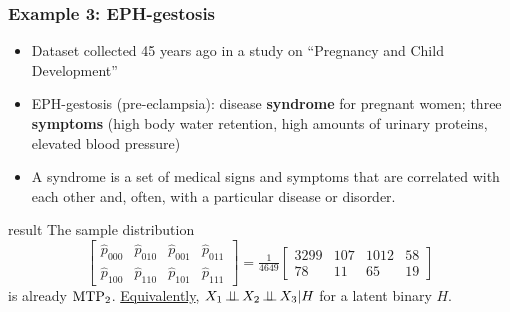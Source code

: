 \documentclass[dvipsnames,aspectratio=169]{beamer} %
\newcommand{\indep}{\mbox{\,$\perp\!\!\!\perp$\,}}
\newcommand{\mtp}{{\rm MTP}_{2}}
\begin{document}
\begin{frame}
\frametitle{Example 3: EPH-gestosis}
{\footnotesize \begin{itemize}
	\item Dataset collected 45 years ago in a study on ``Pregnancy and Child Development'' %
\item {EPH-gestosis (pre-eclampsia):} disease \textbf{syndrome} for pregnant women; three \textbf{symptoms} (high body water retention, high amounts of urinary proteins, elevated blood pressure)
\item A {syndrome} is a set of medical signs and symptoms that are {correlated} with each other and, often, with a particular disease or disorder. 
\end{itemize}	}

\begin{beamercolorbox}[wd=\paperwidth,sep=5pt]{result}
{\footnotesize The sample distribution$$
\left[\begin{array}{cccc}
\hat p_{000} & \hat p_{010} & \hat p_{001} & \hat p_{011} \\
\hat p_{100} & \hat p_{110} & \hat p_{101} & \hat p_{111} 
\end{array}\right]= \tfrac{1}{4649}\left[\begin{array}{cccc}
3299 & 107 & 1012 & 58 \\
78 & 11 & 65 & 19
\end{array}\right]
$$
is already $\mtp$. \underline{Equivalently}, $X_1\indep X_2\indep X_3|H$ for a latent binary $H$.}
\end{beamercolorbox}
\end{frame}
\end{document}
